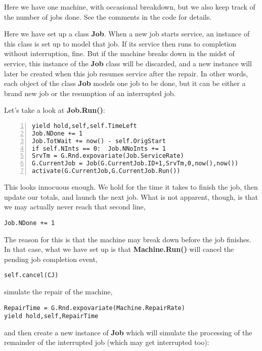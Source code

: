 \documentclass[11pt]{article}
\begin{document}
Here we have one machine, with occasional breakdown, but we also keep
track of the number of jobs done.  See the comments in the code for
details.

Here we have set up a class {\bf Job}.  When a new job starts service,
an instance of this class is set up to model that job.  If its service
then runs to completion without interruption, fine.  But if the machine
breaks down in the midst of service, this instance of the {\bf Job}
class will be discarded, and a new instance will later be created when
this job resumes service after the repair.  In other words, each object
of the class {\bf Job} models one job to be done, but it can be either a
brand new job or the resumption of an interrupted job.  

Let's take a look at {\bf Job.Run()}:

\begin{Verbatim}[fontsize=\relsize{-2},numbers=left]
yield hold,self,self.TimeLeft
Job.NDone += 1
Job.TotWait += now() - self.OrigStart
if self.NInts == 0:  Job.NNoInts += 1
SrvTm = G.Rnd.expovariate(Job.ServiceRate)
G.CurrentJob = Job(G.CurrentJob.ID+1,SrvTm,0,now(),now())
activate(G.CurrentJob,G.CurrentJob.Run())
\end{Verbatim}

This looks innocuous enough.  We hold for the time it takes to finish
the job, then update our totals, and launch the next job.  What is not
apparent, though, is that we may actually never reach that second line,

\begin{Verbatim}[fontsize=\relsize{-2}]
Job.NDone += 1
\end{Verbatim}

The reason for this is that the machine may break down before the job
finishes.  In that case, what we have set up is that {\bf Machine.Run()}
will cancel the pending job completion event, 

\begin{Verbatim}[fontsize=\relsize{-2}]
self.cancel(CJ)
\end{Verbatim}

simulate the repair of the machine,

\begin{Verbatim}[fontsize=\relsize{-2}]
RepairTime = G.Rnd.expovariate(Machine.RepairRate)
yield hold,self,RepairTime
\end{Verbatim}

and then create a new instance of {\bf Job} which will simulate
the processing of the remainder of the interrupted job (which may get
interrupted too):
\end{document}
